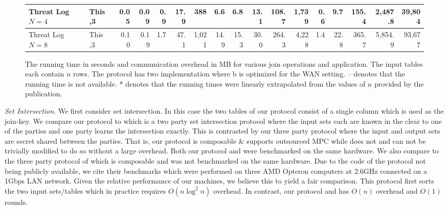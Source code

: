 \documentclass[11pt,letterpaper]{article}
\renewcommand{\paragraph}[1]{\vspace{0.1cm}\noindent\emph{#1}.}
\begin{document}
\begin{figure*}[t!]
\begin{tabular}{|l |l|| r | r |r |r|r||r | r |r |r|r||r|r|r|r|r|}
	Threat Log $N=4$              & This                          \hfill ,3      & 0.05    & 0.09     & 0.9      & 17.9        &        388 &   6.6 & 6.8      & 13.1     & 108.7     &      1,739 &   0.6 &      9.7 &    155.4 &     2,487.8 &      39,804 \\ \hline
	Threat Log $N=8$              & This                          \hfill ,3      & 0.10    & 0.19     & 1.7      & 47.1        &      1,021 &  14.9 & 15.3     & 30.0     & 264.3     &      4,228 &   1.4 &     22.8 &    365.7 &     5,854.9 &      93,677 \\ \hline
\end{tabular}
\vspace{-0.3cm}
\caption{	\label{fig:compare}The running time in seconds and  communication overhead in MB for various join operations and application. The input tables each contain $n$ rows. The  \cite{PSWW18} protocol has two implementation where  \cite{PSWW18}b is optimized for the WAN setting. -- denotes that the running time is not available. * denotes that the running times were linearly extrapolated from the values of $n$ provided by the publication.}
\vspace{-0.2cm}
\end{figure*}






\paragraph{Set Intersection} We first consider set intersection. In this case the two tables of our protocol consist of a single column which is used as the join-key. We compare our protocol to \cite{CCS:KKRT16} which is a two party set intersection protocol where the input sets each are known in the clear to one of the parties and one party learns the intersection exactly. This is contrasted by our three party protocol where the input and output sets are secret shared between the parties. That is, our protocol is composable \& supports outsourced MPC while \cite{CCS:KKRT16} does not and can not be trivially modified to do so without a large overhead. Both our protocol and \cite{CCS:KKRT16} were benchmarked on the same hardware. We also compare to the three party protocol of \cite{ASIACCS:BlaAgu12} which is composable and was not benchmarked on the same hardware. Due to the code of the \cite{ASIACCS:BlaAgu12} protocol not being publicly available, we cite their benchmarks which were performed on three AMD Opteron computers at 2.6GHz connected on a 1Gbps LAN network. Given the relative performance of our machines, we believe this to yield a fair comparison. This protocol first sorts the two input sets/tables which in practice requires $O(n\log^2 n)$ overhead\cite{ASIACCS:BlaAgu12}. In contrast, our protocol and \cite{CCS:KKRT16} has $O(n)$ overhead and $O(1)$ rounds. 
\end{document}
